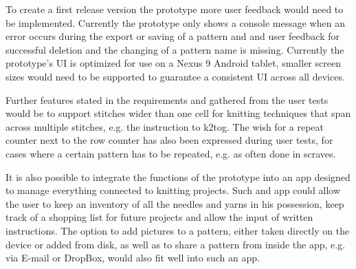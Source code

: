 To create a first release version the prototype more user feedback would need to be implemented. Currently the prototype only shows a console message when an error occurs during the export or saving of a pattern and and user feedback for successful deletion and the changing of a pattern name is missing. Currently the prototype's \gls{UI} is optimized for use on a Nexus 9 Android tablet, smaller screen sizes would need to be supported to guarantee a consistent \gls{UI} across all devices. 

Further features stated in the requirements and gathered from the user tests would be to support stitches wider than one cell for knitting techniques that span across multiple stitches, e.g. the instruction to \gls{k2tog}. The wish for a repeat counter next to the row counter has also been expressed during user tests, for cases where a certain pattern has to be repeated, e.g. as often done in scraves.

It is also possible to integrate the functions of the prototype into an app designed to manage everything connected to knitting projects. Such and app could allow the user to keep an inventory of all the needles and yarns in his possession, keep track of a shopping list for future projects and allow the input of written instructions. The option to add pictures to a pattern, either taken directly on the device or added from disk, as well as to share a pattern from inside the app, e.g. via E-mail or DropBox, would also fit well into such an app. 

